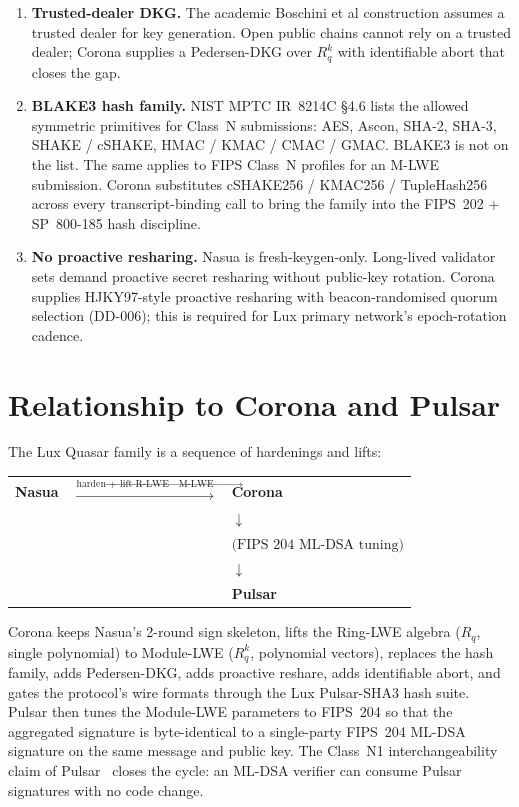 \documentclass[11pt,a4paper]{article}
\theoremstyle{definition}
\theoremstyle{remark}
\newcommand{\Rq}{R_q}
\begin{document}
\begin{enumerate}[leftmargin=*, itemsep=0pt]
\item \textbf{Trusted-dealer DKG.} The academic Boschini et al
construction assumes a trusted dealer for key generation. Open
public chains cannot rely on a trusted dealer; Corona supplies a
Pedersen-DKG over $\Rq^k$ with identifiable abort that closes the
gap.
\item \textbf{BLAKE3 hash family.} NIST MPTC IR~8214C \S4.6 lists
the allowed symmetric primitives for Class~N submissions:
AES, Ascon, SHA-2, SHA-3, SHAKE / cSHAKE, HMAC / KMAC / CMAC / GMAC.
BLAKE3 is not on the list. The same applies to FIPS Class~N
profiles for an M-LWE submission. Corona substitutes
cSHAKE256 / KMAC256 / TupleHash256 across every transcript-binding
call to bring the family into the FIPS~202 + SP~800-185
hash discipline.
\item \textbf{No proactive resharing.} Nasua is fresh-keygen-only.
Long-lived validator sets demand proactive secret resharing without
public-key rotation. Corona supplies HJKY97-style proactive
resharing with beacon-randomised quorum selection (DD-006); this is
required for Lux primary network's epoch-rotation cadence.
\end{enumerate}

\section{Relationship to Corona and Pulsar}
\label{sec:relationship}

The Lux Quasar family is a sequence of hardenings and lifts:

\begin{center}
\begin{tabular}{r c l}
\textbf{Nasua} & $\xrightarrow{\text{harden + lift R-LWE} \to \text{M-LWE}}$ & \textbf{Corona} \\
                 &                                & \quad $\downarrow$ \\
                 &                                & \quad $\text{(FIPS~204 ML-DSA tuning)}$ \\
                 &                                & \quad $\downarrow$ \\
                 &                                & \textbf{Pulsar} \\
\end{tabular}
\end{center}

Corona keeps Nasua's 2-round sign skeleton, lifts the Ring-LWE
algebra ($\Rq$, single polynomial) to Module-LWE
($\Rq^k$, polynomial vectors), replaces the hash
family, adds Pedersen-DKG, adds proactive reshare, adds
identifiable abort, and gates the protocol's wire formats through
the Lux Pulsar-SHA3 hash suite. Pulsar then tunes the Module-LWE
parameters to FIPS~204 so that the aggregated signature is
byte-identical to a single-party FIPS~204 ML-DSA signature on the
same message and public key. The Class~N1 interchangeability claim
of Pulsar~\cite{pulsar} closes the cycle: an ML-DSA verifier can
consume Pulsar signatures with no code change.
\end{document}
